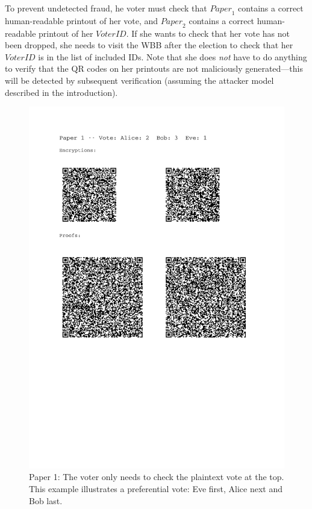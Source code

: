 \documentclass[12pt,a4paper]{article}
\theoremstyle{definition}
\newcommand{\VoterID}{\mathit{VoterID}}
\newcommand{\Paper}{\mathit{Paper}}
\begin{document}
To prevent undetected fraud, he voter must check that $\Paper_1$ contains a correct human-readable printout of her vote, and $\Paper_2$ contains a correct human-readable printout of her $\VoterID$. If she wants to check that her vote has not been dropped, she needs to visit the WBB after the election to check that her $\VoterID$ is in the list of included IDs.  Note that she does \emph{not} have to do anything to verify that the QR codes on her printouts are not maliciously generated---this will be detected by subsequent verification (assuming the attacker model described in the introduction).

\begin{figure}
	\centering
	\includegraphics[scale=0.5, trim=2.5cm 10cm 3.1cm 0cm, clip=true]{paper1.pdf}
	\caption{Paper 1: The voter only needs to check the plaintext vote at the top.  This example illustrates a preferential vote: Eve first, Alice next and Bob last.}
	\label{fig:paper1}
\end{figure}
\end{document}

